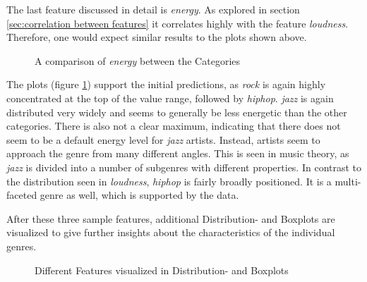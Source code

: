 The last feature discussed in detail is \emph{energy}.
As explored in section \ref{sec:correlation between features} it correlates highly with the feature \emph{loudness}.
Therefore, one would expect similar results to the plots shown above.

\begin{figure}[H]
    \centering
    \qquad
    \caption{A comparison of \emph{energy} between the Categories}%
    \label{fig:du_dp_bp_enrg_categorie_dependent}%
\end{figure}

The plots (figure \ref{fig:du_dp_bp_enrg_categorie_dependent}) support the initial predictions, as \emph{rock} is again highly concentrated at the top of
the value range, followed by \emph{hiphop}. \emph{jazz} is again distributed very widely and
seems to generally be less energetic than the other categories. There is also not a clear maximum,
indicating that there does not seem to be a default energy level for \emph{jazz} artists.
Instead, artists seem to approach the genre from many different angles. This is seen in music
theory, as \emph{jazz} is divided into a number of subgenres with different properties.
In contrast to the distribution seen in \emph{loudness}, \emph{hiphop} is fairly broadly positioned.
It is a multi-faceted genre as well, which is supported by the data.

After these three sample features, additional Distribution- and Boxplots are visualized
to give further insights about the characteristics of the individual genres.

\begin{figure}[H]
    \centering
    \qquad
    \qquad
    \qquad
    \qquad
    \qquad
    \qquad
    \qquad
    \caption{Different Features visualized in Distribution- and Boxplots}%
    \label{fig:other exploration plots}%
\end{figure}